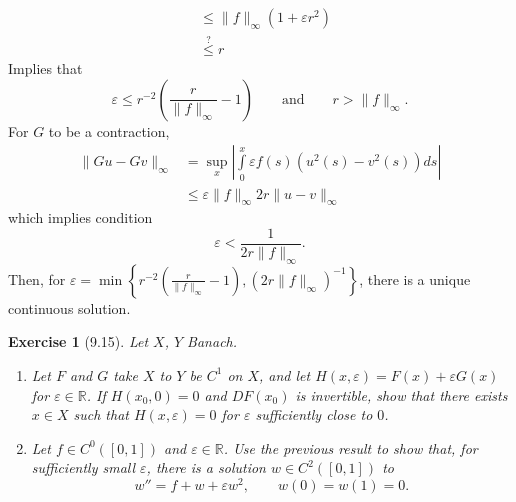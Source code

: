 \documentclass[letterpaper,twoside,11pt]{article}
\theoremstyle{mystyle}
\newtheorem*{exercise}{Exercise}
\newcommand{\R}{{\mathbb R}}
\newcommand{\cbk}{\color{black}}
\newcommand{\inv}{^{-1}}
\newcommand{\ve}{\varepsilon}
\begin{document}
\begin{enumerate}
\begin{align*}
    &\leq \|f\|_{\infty}\left( 1 + \ve r^2 \right)\\
    &\mathop{\leq}\limits^? r
  \end{align*}
  Implies that 
  \[\ve \leq r^{-2} \left(\frac{r}{\|f\|_{\infty}}-1\right) \qquad \text{and} \qquad r > \|f\|_{\infty}.\]
  For $G$ to be a contraction, 
  \begin{align*}
    \|Gu-Gv\|_{\infty} &= \sup_x \left\vert \int\limits_0^x \ve f(s) (u^2(s) - v^2(s)) ds\right\vert \\ 
    &\leq \ve \|f\|_{\infty} 2r \|u-v\|_{\infty}
  \end{align*}
  which implies condition 
  \[\ve < \frac{1}{2r\|f\|_{\infty}}.\]
  Then, for $\ve = \min\left\{ r^{-2} \left(\frac{r}{\|f\|_{\infty}}-1\right), \left( 2r\|f\|_{\infty} \right)\inv \right\}$, there is a unique continuous solution. 
\end{enumerate}

\cbk



\begin{exercise}[9.15]
   Let $X$, $Y$ Banach. 
  \begin{enumerate}
    \item Let $F$ and $G$ take $X$ to $Y$ be $C^1$ on $X$, and let $H(x, \ve) = F(x) + \ve G(x)$ for $\ve \in \R$. If $H(x_0, 0) = 0$ and $DF(x_0)$ is invertible, show that there exists $x\in X$ such that $H(x, \ve) = 0$ for $\ve$ sufficiently close to $0$. 
    \item Let $f\in C^0 \left( [0,1] \right)$ and $\ve \in \R$. Use the previous result to show that, for sufficiently small $\ve$, there is a solution $w \in C^2 \left( [0,1] \right)$ to 
    \[w'' = f + w + \ve w^2 , \qquad w(0) = w(1) = 0.\] 
  \end{enumerate}
\end{exercise}
\end{document}
